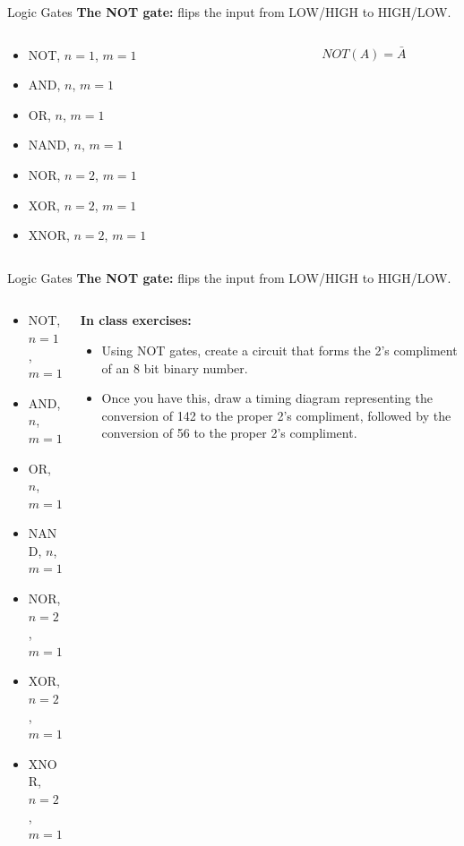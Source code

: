 \documentclass{beamer}
\begin{document}
\begin{frame}{Logic Gates}
\textbf{The NOT gate:} flips the input from LOW/HIGH to HIGH/LOW. \\ \vspace{0.5cm}
\begin{columns}[T]
\begin{column}{0.5\textwidth}
\begin{itemize}
\item \alert{NOT, $n=1$, $m=1$}
\item AND, $n$, $m=1$
\item OR, $n$, $m=1$
\item NAND, $n$, $m=1$
\item NOR, $n=2$, $m=1$
\item XOR, $n=2$, $m=1$
\item XNOR, $n=2$, $m=1$
\end{itemize}
\end{column}
\begin{column}{0.5\textwidth}
\begin{equation}
NOT (A) = \bar{A}
\end{equation}
\end{column}
\end{columns}
\end{frame}

\begin{frame}{Logic Gates}
\textbf{The NOT gate:} flips the input from LOW/HIGH to HIGH/LOW. \\ \vspace{0.5cm}
\begin{columns}[T]
\begin{column}{0.5\textwidth}
\begin{itemize}
\item \alert{NOT, $n=1$, $m=1$}
\item AND, $n$, $m=1$
\item OR, $n$, $m=1$
\item NAND, $n$, $m=1$
\item NOR, $n=2$, $m=1$
\item XOR, $n=2$, $m=1$
\item XNOR, $n=2$, $m=1$
\end{itemize}
\end{column}
\begin{column}{0.5\textwidth}
\textbf{In class exercises:}
\small
\begin{itemize}
\item Using NOT gates, create a circuit that forms the 2's compliment of an 8 bit binary number.
\item Once you have this, draw a timing diagram representing the conversion of 142 to the proper 2's compliment, followed by the conversion of 56 to the proper 2's compliment.
\end{itemize}
\end{column}
\end{columns}
\end{frame}
\end{document}
